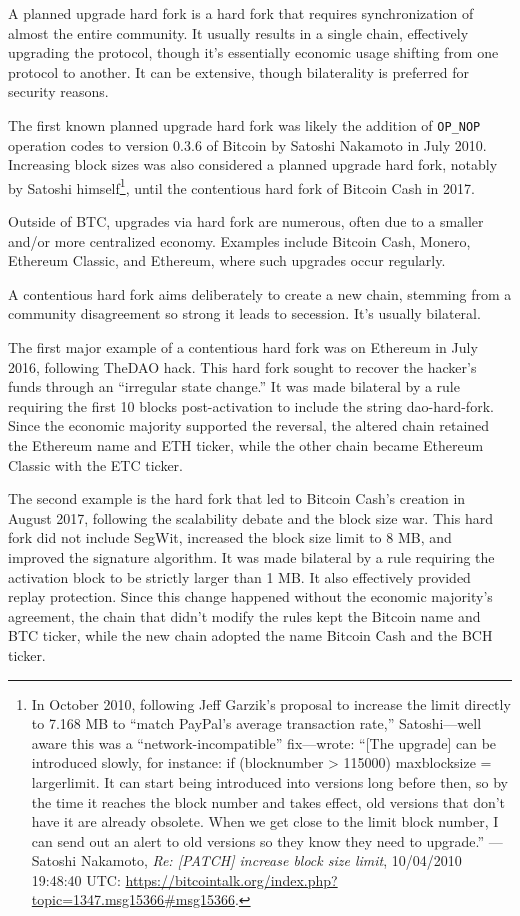 \documentclass[
  a5paper,
  smalldemyvopaper,10pt,twoside,onecolumn,openright,extrafontsizes,hidelinks]{memoir}
\begin{document}
A planned upgrade hard fork is a hard fork that requires synchronization
of almost the entire community. It usually results in a single chain,
effectively upgrading the protocol, though it's essentially economic
usage shifting from one protocol to another. It can be extensive, though
bilaterality is preferred for security reasons.

The first known planned upgrade hard fork was likely the addition of
\texttt{OP\_NOP} operation codes to version 0.3.6 of Bitcoin by Satoshi
Nakamoto in July 2010. Increasing block sizes was also considered a
planned upgrade hard fork, notably by Satoshi himself\footnote{In
  October 2010, following Jeff Garzik's proposal to increase the limit
  directly to 7.168 MB to ``match PayPal's average transaction rate,''
  Satoshi---well aware this was a ``network-incompatible'' fix---wrote:
  ``{[}The upgrade{]} can be introduced slowly, for instance: if
  (blocknumber \textgreater{} 115000) maxblocksize = largerlimit. It can
  start being introduced into versions long before then, so by the time
  it reaches the block number and takes effect, old versions that don't
  have it are already obsolete. When we get close to the limit block
  number, I can send out an alert to old versions so they know they need
  to upgrade.'' --- Satoshi Nakamoto, \emph{Re: {[}PATCH{]} increase
  block size limit}, 10/04/2010 19:48:40 UTC:
  \url{https://bitcointalk.org/index.php?topic=1347.msg15366\#msg15366}.},
until the contentious hard fork of Bitcoin Cash in 2017.

Outside of BTC, upgrades via hard fork are numerous, often due to a
smaller and/or more centralized economy. Examples include Bitcoin Cash,
Monero, Ethereum Classic, and Ethereum, where such upgrades occur
regularly.

A contentious hard fork aims deliberately to create a new chain,
stemming from a community disagreement so strong it leads to secession.
It's usually bilateral.

The first major example of a contentious hard fork was on Ethereum in
July 2016, following TheDAO hack. This hard fork sought to recover the
hacker's funds through an ``irregular state change.'' It was made
bilateral by a rule requiring the first 10 blocks post-activation to
include the string dao-hard-fork. Since the economic majority supported
the reversal, the altered chain retained the Ethereum name and ETH
ticker, while the other chain became Ethereum Classic with the ETC
ticker.

The second example is the hard fork that led to Bitcoin Cash's creation
in August 2017, following the scalability debate and the block size war.
This hard fork did not include SegWit, increased the block size limit to
8 MB, and improved the signature algorithm. It was made bilateral by a
rule requiring the activation block to be strictly larger than 1 MB. It
also effectively provided replay protection. Since this change happened
without the economic majority's agreement, the chain that didn't modify
the rules kept the Bitcoin name and BTC ticker, while the new chain
adopted the name Bitcoin Cash and the BCH ticker.
\end{document}
